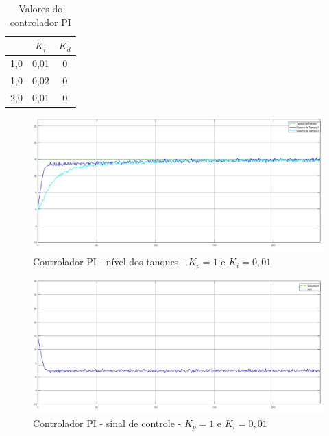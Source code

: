 \documentclass[
	12pt,				%
	openany,			%
	oneside,			%
	a4paper,			%
	english,			%
	french,				%
	spanish,			%
	brazil,				%
	]{abntex2}
\begin{document}
{\begin{table}[h]
\centering
\begin{tabular}{ccc}
\multicolumn{0}{c}{} $K_p$ & $K_i$ & $K_d$ \\\hline
                    1,0 & 0,01 & 0 \\
                    1,0 & 0,02 & 0 \\
                    2,0 & 0,01 & 0
\end{tabular}
\caption{Valores do controlador PI}
\label{tab:tabelaPI}
\end{table}

\begin{figure}[h]
	\centering
	\includegraphics[scale=0.30]{1 - nivel_PI_1kp_001ki.jpg}
	\caption{Controlador PI - nível dos tanques - $K_p = 1$ e $K_i = 0,01$}
	\label{fig:controladorPI_1}
\end{figure}

\begin{figure}[h]
	\centering
	\includegraphics[scale=0.30]{1 - PI sinal_controle.jpg}
	\caption{Controlador PI - sinal de controle - $K_p = 1$ e $K_i = 0,01$}
	\label{fig:sinal_controladorPI_1}
\end{figure}

}
\end{document}
